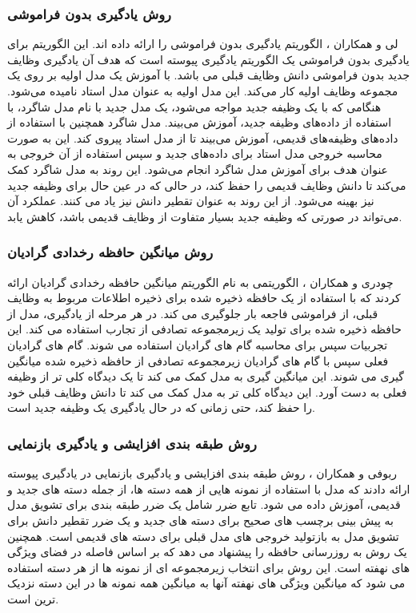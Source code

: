 \subsubsection{روش یادگیری بدون فراموشی}
لی و همکاران
\cite{8}
، الگوریتم یادگیری بدون فراموشی
را ارائه داده اند. این الگوریتم برای یادگیری بدون فراموشی یک الگوریتم یادگیری پیوسته است که هدف آن یادگیری وظایف جدید بدون فراموشی دانش وظایف قبلی می باشد. با آموزش یک مدل اولیه بر روی یک مجموعه وظایف اولیه کار می‌کند. این مدل اولیه به عنوان مدل استاد نامیده می‌شود.
هنگامی که با یک وظیفه جدید مواجه می‌شود، یک مدل جدید با نام مدل شاگرد، با استفاده از داده‌های وظیفه جدید، آموزش می‌بیند. مدل شاگرد همچنین با استفاده از داده‌های وظیفه‌های قدیمی، آموزش می‌بیند تا از مدل استاد پیروی کند. این به صورت محاسبه خروجی مدل استاد برای داده‌های جدید و سپس استفاده از آن خروجی به عنوان هدف برای آموزش مدل شاگرد انجام می‌شود. این روند به مدل شاگرد کمک می‌کند تا دانش وظایف قدیمی را حفظ کند، در حالی که در عین حال برای وظیفه جدید نیز بهینه می‌شود. از این روند به عنوان تقطیر دانش
نیز یاد می کنند. عملکرد آن می‌تواند در صورتی که وظیفه جدید بسیار متفاوت از وظایف قدیمی باشد، کاهش یابد.

\subsubsection{روش میانگین حافظه رخدادی گرادیان}
چودری و همکاران 
\cite{10}
، الگوریتمی به نام الگوریتم میانگین حافظه رخدادی گرادیان
ارائه کردند که با استفاده از یک حافظه ذخیره شده برای ذخیره اطلاعات مربوط به وظایف قبلی، از فراموشی فاجعه بار جلوگیری می کند. در هر مرحله از یادگیری، مدل از حافظه ذخیره شده برای تولید یک زیرمجموعه تصادفی از تجارب استفاده می کند. این تجربیات سپس برای محاسبه گام های گرادیان استفاده می شوند. گام های گرادیان فعلی سپس با گام های گرادیان زیرمجموعه تصادفی از حافظه ذخیره شده میانگین گیری می شوند. این میانگین گیری به مدل کمک می کند تا یک دیدگاه کلی تر از وظیفه فعلی به دست آورد. این دیدگاه کلی تر به مدل کمک می کند تا دانش وظایف قبلی خود را حفظ کند، حتی زمانی که در حال یادگیری یک وظیفه جدید است.

\subsubsection{روش طبقه بندی افزایشی و یادگیری بازنمایی}
ربوفی و همکاران 
\cite{11}
، روش طبقه بندی افزایشی و یادگیری بازنمایی
در یادگیری پیوسته ارائه دادند که مدل با استفاده از نمونه هایی از همه دسته ها، از جمله دسته های جدید و قدیمی، آموزش داده می شود. تابع ضرر شامل یک ضرر طبقه بندی برای تشویق مدل به پیش بینی برچسب های صحیح برای دسته های جدید و یک ضرر تقطیر دانش برای تشویق مدل به بازتولید خروجی های مدل قبلی برای دسته های قدیمی است. همچنین یک روش به روزرسانی حافظه را پیشنهاد می دهد که بر اساس فاصله در فضای ویژگی های نهفته است. این روش برای انتخاب زیرمجموعه ای از نمونه ها از هر دسته استفاده می شود که میانگین ویژگی های نهفته آنها به میانگین همه نمونه ها در این دسته نزدیک ترین است.

